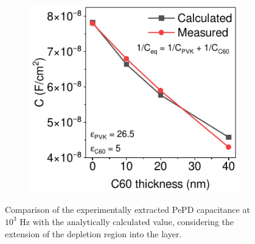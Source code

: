 \begin{figure}[ht!]
    \centering
    
    \begin{subfigure}[t]{0.45\textwidth}
        \centering
        \includegraphics[width=\textwidth]{chapters/transport_layers/images/C_f_c60_thick.pdf} %
    \end{subfigure}
    \caption{Comparison of the experimentally extracted PePD capacitance at $10^3$ Hz with the analytically calculated value, considering the extension of the depletion region into the  layer.}
    \label{fig:etl_opt:capacitance_numerical_measured}
\end{figure}




